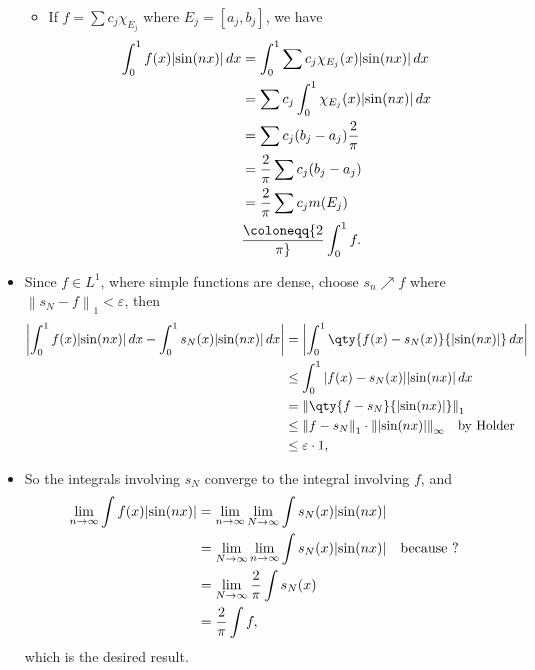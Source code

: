 \begin{solution}
\begin{itemize}
  \begin{itemize}
  \tightlist
  \item
    If \(f = \sum c_j \chi_{E_j}\) where \(E_j = [a_j, b_j]\), we have
    \begin{align*}  
    \int_0^1 f(x) {\left\lvert {\sin(nx)} \right\rvert}\,dx 
    &= \int_0^1 \sum c_j \chi_{E_j}(x) {\left\lvert {\sin(nx)} \right\rvert}\,dx  \\
    &= \sum c_j \int_0^1 \chi_{E_j}(x) {\left\lvert {\sin(nx)} \right\rvert}\,dx \\
    &= \sum c_j (b_j - a_j) {2\over \pi} \\
    &= {2\over \pi} \sum c_j (b_j - a_j) \\
    &= {2\over \pi} \sum c_j m(E_j) \\
    &\coloneqq{2\over \pi} \int_0^1 f
    .\end{align*}
  \end{itemize}
\item
  Since \(f\in L^1\), where simple functions are dense, choose
  \(s_n\nearrow f\) where
  \({\left\lVert {s_N - f} \right\rVert}_1 < {\varepsilon}\), then
  \begin{align*}  
  {\left\lvert { \int_0^1 f(x) {\left\lvert {\sin(nx)} \right\rvert} \,dx - \int_0^1 s_N(x) {\left\lvert {\sin(nx)} \right\rvert}\,dx } \right\rvert} 
  &= {\left\lvert { \int_0^1 \qty{f(x) - s_N(x)} {\left\lvert {\sin(nx)} \right\rvert} \,dx } \right\rvert} \\
  &\leq \int_0^1 {\left\lvert { f(x) - s_N(x)} \right\rvert} {\left\lvert {\sin(nx)} \right\rvert} \,dx \\
  &= {\left\lVert { \qty{f - s_N} {\left\lvert {\sin(nx)} \right\rvert} } \right\rVert}_1 \\
  &\leq {\left\lVert {f-s_N} \right\rVert}_1 \cdot {\left\lVert {{\left\lvert {\sin(nx)} \right\rvert}} \right\rVert}_\infty \quad\text{by Holder}\\
  &\leq {\varepsilon}\cdot 1
  ,\end{align*}
\item
  So the integrals involving \(s_N\) converge to the integral involving
  \(f\), and
  \begin{align*}
  \lim_{n\to\infty} \int f(x){\left\lvert {\sin(nx)} \right\rvert} 
  &= \lim_{n\to\infty} \lim_{N\to\infty} \int s_N(x) {\left\lvert {\sin(nx)} \right\rvert} \\
  &= \lim_{N\to\infty} \lim_{n\to\infty} \int s_N(x) {\left\lvert {\sin(nx)} \right\rvert} \quad\text{because ?}\\
  &= \lim_{N\to \infty} {2\over \pi} \int s_N(x) \\
  &= {2\over \pi} \int f
  ,\end{align*}
  which is the desired result.
\end{itemize}

\end{solution}

